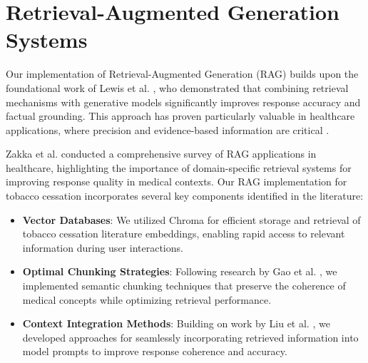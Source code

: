 \section{Retrieval-Augmented Generation Systems}


Our implementation of Retrieval-Augmented Generation (RAG) builds upon the foundational work of Lewis et al. \cite{RAG}, who demonstrated that combining retrieval mechanisms with generative models significantly improves response accuracy and factual grounding. This approach has proven particularly valuable in healthcare applications, where precision and evidence-based information are critical \cite{RAGHealthcare}.

Zakka et al. \cite{RAGHealthcare} conducted a comprehensive survey of RAG applications in healthcare, highlighting the importance of domain-specific retrieval systems for improving response quality in medical contexts. Our RAG implementation for tobacco cessation incorporates several key components identified in the literature:

\begin{itemize}[label=$\bullet$, leftmargin=1cm, itemsep=0.2cm]
\item \textbf{Vector Databases}: We utilized Chroma \cite{Chroma} for efficient storage and retrieval of tobacco cessation literature embeddings, enabling rapid access to relevant information during user interactions.

\item \textbf{Optimal Chunking Strategies}: Following research by Gao et al. \cite{RAGChunking}, we implemented semantic chunking techniques that preserve the coherence of medical concepts while optimizing retrieval performance.

\item \textbf{Context Integration Methods}: Building on work by Liu et al. \cite{RAGPrompting}, we developed approaches for seamlessly incorporating retrieved information into model prompts to improve response coherence and accuracy.
\end{itemize}

